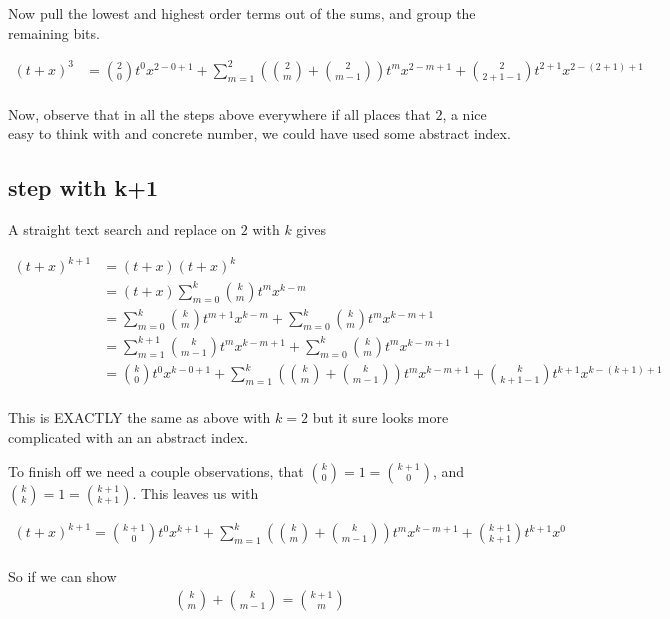 \documentclass{article}
\begin{document}
Now pull the lowest and highest order terms out of the sums, and group the
remaining bits.

\begin{align*}
(t + x)^3 
&= 
 \binom{2}{0} t^{0} x^{2 - 0 + 1} 
+ \sum_{m=1}^{2} \left( \binom{2}{m} + \binom{2}{m-1} \right) t^{m} x^{2 - m + 1} 
+ \binom{2}{2 + 1 -1} t^{2 + 1} x^{2 - (2 + 1) + 1} 
\\
\end{align*}

Now, observe that in all the steps above everywhere if all places that $2$, a nice easy to think with and concrete number, we could have used some
abstract index.

\subsection{ step with k+1 }

A straight text search and replace on $2$ with $k$ gives

\begin{align*}
(t + x)^{k+1}
&= (t + x)(t + x)^k  \\
&= (t + x)\sum_{m=0}^k \binom{k}{m} t^m x^{k-m} \\
&= 
\sum_{m=0}^k \binom{k}{m} t^{m+1} x^{k-m} 
+ \sum_{m=0}^k \binom{k}{m} t^{m} x^{k-m + 1} \\
&= 
\sum_{m=1}^{k + 1} \binom{k}{m-1} t^{m} x^{k - m + 1} 
+ \sum_{m=0}^k \binom{k}{m} t^{m} x^{k-m + 1} \\
&= 
 \binom{k}{0} t^{0} x^{k - 0 + 1} 
+ \sum_{m=1}^{k} \left( \binom{k}{m} + \binom{k}{m-1} \right) t^{m} x^{k - m + 1} 
+ \binom{k}{k + 1 -1} t^{k + 1} x^{k - (k + 1) + 1} \\
\end{align*}

This is EXACTLY the same as above with $k=2$ but it sure looks more complicated with an an abstract index.

To finish off we need a couple observations, that 
$\binom{k}{0} = 1 = \binom{k+1}{0}$, and $\binom{k}{k} = 1 = \binom{k+1}{k+1}$.  This leaves us with

\begin{align*}
(t + x)^{k+1}
= \binom{k+1}{0} t^{0} x^{k + 1} 
+ \sum_{m=1}^{k} \left( \binom{k}{m} + \binom{k}{m-1} \right) t^{m} x^{k - m + 1} 
+ \binom{k + 1}{k + 1} t^{k + 1} x^{0} \\
\end{align*}

So if we can show
\begin{align*}
\binom{k}{m} + \binom{k}{m-1} = \binom{k+1}{m}
\end{align*}
\end{document}
